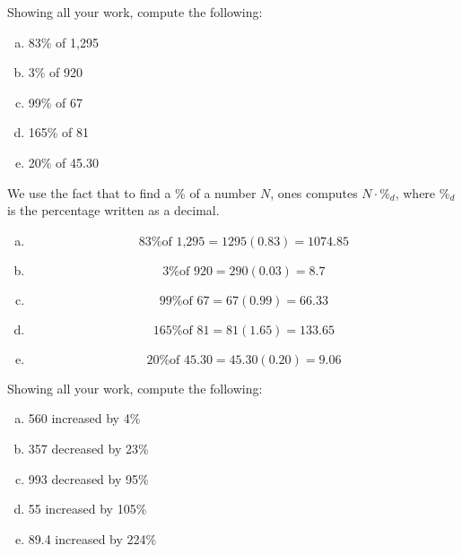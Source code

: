 \documentclass[11pt,letterpaper]{article}
\begin{document}

 Showing all your work, compute the following:
	\begin{enumerate}[(a)]
	\item 83\% of 1,295
	\item 3\% of 920
	\item 99\% of 67
	\item 165\% of 81
	\item 20\% of 45.30
	\end{enumerate} \pspace

\sol We use the fact that to find a \% of a number $N$, ones computes $N \cdot \%_d$, where $\%_d$ is the percentage written as a decimal. 
\begin{enumerate}[(a)]
\item 
	\[
	\text{83\% of 1,295}= 1295(0.83)= 1074.85
	\] \pspace

\item 
	\[
	\text{3\% of 920}= 290(0.03)= 8.7
	\] \pspace

\item 
	\[
	\text{99\% of 67}= 67(0.99)= 66.33
	\] \pspace

\item 
	\[
	\text{165\% of 81}= 81(1.65)= 133.65
	\] \pspace

\item 
	\[
	\text{20\% of 45.30}= 45.30(0.20)= 9.06
	\] 
\end{enumerate}



\newpage



 Showing all your work, compute the following:
	\begin{enumerate}[(a)]
	\item 560 increased by 4\%
	\item 357 decreased by 23\%
	\item 993 decreased by 95\%
	\item 55 increased by 105\%
	\item 89.4 increased by 224\%
	\end{enumerate} \pspace
\end{document}
